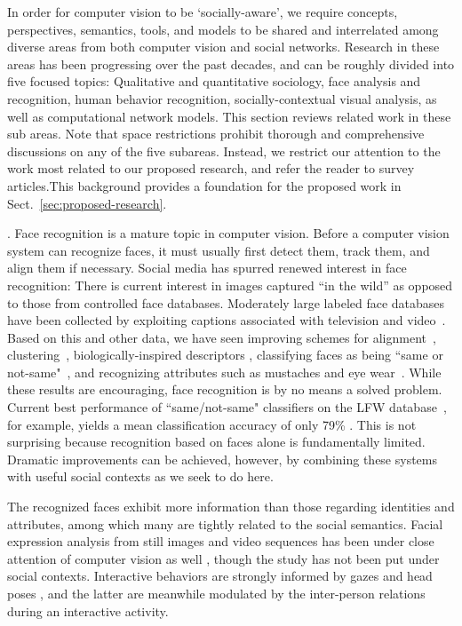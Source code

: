 
In order for computer vision to be `socially-aware', we require concepts, perspectives, semantics, tools, and models to be shared and interrelated among diverse areas from both computer vision and social networks. Research in these areas has been progressing over the past decades, and can be roughly divided into five focused topics: Qualitative and quantitative sociology, face analysis and recognition, human behavior recognition, socially-contextual visual analysis, as well as computational network models. This section reviews related work in these sub areas. Note that space restrictions prohibit thorough and comprehensive discussions on any of the five subareas. Instead, we restrict our attention to the work most related to our proposed research, and refer the reader to survey articles.This background provides a foundation for the proposed work in Sect.~\ref{sec:proposed-research}.

. Face recognition is a mature topic in computer vision. Before a computer vision system can recognize \cite{Chellappa:face} faces, it must usually first detect \cite{ViolaJones,Zhang:detect} them, track \cite{Comaniciu:track} them, and align \cite{Matthews:AAM,Lucey:AAM,Mumford:face} them if necessary. Social media has spurred renewed interest in face recognition: There is current interest in images captured ``in the wild'' as opposed to those from controlled face databases. Moderately large labeled face databases have been collected by exploiting captions associated with television and video~\cite{berg2004naf,berg2005sp,Everingham06a,huang:lfw}. Based on this and other data, we have seen improving schemes for alignment~\cite{huang:lfw,HolubMoreelsPeronaFG08}, clustering~\cite{HolubMoreelsPeronaFG08}, biologically-inspired descriptors \cite{PintoZickler2011}, classifying faces as being ``same or not-same"~\cite{nowak2007lvs}, and recognizing attributes such as mustaches and eye wear~\cite{LNCS53050340}. While these results are encouraging, face recognition is by no means a solved problem. Current best performance of  ``same/not-same" classifiers on the LFW database~\cite{huang:lfw}, for example, yields a mean classification accuracy of only 79\% \cite{Pinto2009}. This is not surprising because recognition based on faces alone is fundamentally limited. Dramatic improvements can be achieved, however, by combining these systems with useful social contexts as we seek to do here.

The recognized faces exhibit more information than those regarding identities and attributes, among which many are tightly related to the social semantics. Facial expression analysis from still images and video sequences has been under close attention of computer vision as well \cite{Yacoob:expression,delaTorre:expression,Essa:expression}, though the study has not been put under social contexts. Interactive behaviors are strongly informed by gazes \cite{Hanson} and head poses \cite{Murphy-Chutorian:pose}, and the latter are meanwhile modulated by the inter-person relations during an interactive activity.


